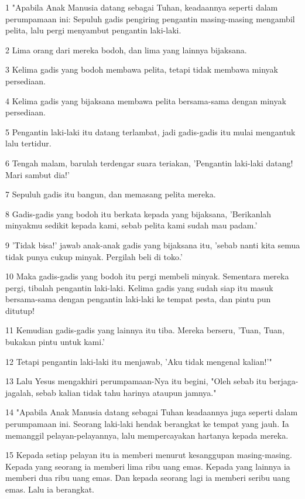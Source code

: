 \par 1 "Apabila Anak Manusia datang sebagai Tuhan, keadaannya seperti dalam perumpamaan ini: Sepuluh gadis pengiring pengantin masing-masing mengambil pelita, lalu pergi menyambut pengantin laki-laki.
\par 2 Lima orang dari mereka bodoh, dan lima yang lainnya bijaksana.
\par 3 Kelima gadis yang bodoh membawa pelita, tetapi tidak membawa minyak persediaan.
\par 4 Kelima gadis yang bijaksana membawa pelita bersama-sama dengan minyak persediaan.
\par 5 Pengantin laki-laki itu datang terlambat, jadi gadis-gadis itu mulai mengantuk lalu tertidur.
\par 6 Tengah malam, barulah terdengar suara teriakan, 'Pengantin laki-laki datang! Mari sambut dia!'
\par 7 Sepuluh gadis itu bangun, dan memasang pelita mereka.
\par 8 Gadis-gadis yang bodoh itu berkata kepada yang bijaksana, 'Berikanlah minyakmu sedikit kepada kami, sebab pelita kami sudah mau padam.'
\par 9 'Tidak bisa!' jawab anak-anak gadis yang bijaksana itu, 'sebab nanti kita semua tidak punya cukup minyak. Pergilah beli di toko.'
\par 10 Maka gadis-gadis yang bodoh itu pergi membeli minyak. Sementara mereka pergi, tibalah pengantin laki-laki. Kelima gadis yang sudah siap itu masuk bersama-sama dengan pengantin laki-laki ke tempat pesta, dan pintu pun ditutup!
\par 11 Kemudian gadis-gadis yang lainnya itu tiba. Mereka berseru, 'Tuan, Tuan, bukakan pintu untuk kami.'
\par 12 Tetapi pengantin laki-laki itu menjawab, 'Aku tidak mengenal kalian!'"
\par 13 Lalu Yesus mengakhiri perumpamaan-Nya itu begini, "Oleh sebab itu berjaga-jagalah, sebab kalian tidak tahu harinya ataupun jamnya."
\par 14 "Apabila Anak Manusia datang sebagai Tuhan keadaannya juga seperti dalam perumpamaan ini. Seorang laki-laki hendak berangkat ke tempat yang jauh. Ia memanggil pelayan-pelayannya, lalu mempercayakan hartanya kepada mereka.
\par 15 Kepada setiap pelayan itu ia memberi menurut kesanggupan masing-masing. Kepada yang seorang ia memberi lima ribu uang emas. Kepada yang lainnya ia memberi dua ribu uang emas. Dan kepada seorang lagi ia memberi seribu uang emas. Lalu ia berangkat.
